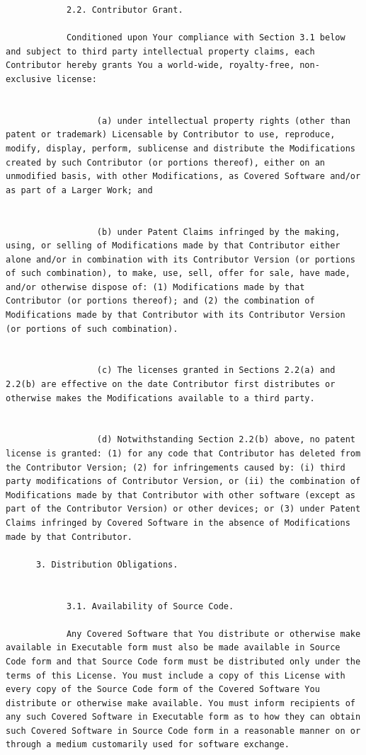 \documentclass[10pt, headsepline,DIV14,BCOR0.5cm]{scrreprt}
\begin{document}
\begin{lstlisting}
            2.2. Contributor Grant.

            Conditioned upon Your compliance with Section 3.1 below and subject to third party intellectual property claims, each Contributor hereby grants You a world-wide, royalty-free, non-exclusive license:
                  

                  (a) under intellectual property rights (other than patent or trademark) Licensable by Contributor to use, reproduce, modify, display, perform, sublicense and distribute the Modifications created by such Contributor (or portions thereof), either on an unmodified basis, with other Modifications, as Covered Software and/or as part of a Larger Work; and
                  

                  (b) under Patent Claims infringed by the making, using, or selling of Modifications made by that Contributor either alone and/or in combination with its Contributor Version (or portions of such combination), to make, use, sell, offer for sale, have made, and/or otherwise dispose of: (1) Modifications made by that Contributor (or portions thereof); and (2) the combination of Modifications made by that Contributor with its Contributor Version (or portions of such combination).
                  

                  (c) The licenses granted in Sections 2.2(a) and 2.2(b) are effective on the date Contributor first distributes or otherwise makes the Modifications available to a third party.
                  

                  (d) Notwithstanding Section 2.2(b) above, no patent license is granted: (1) for any code that Contributor has deleted from the Contributor Version; (2) for infringements caused by: (i) third party modifications of Contributor Version, or (ii) the combination of Modifications made by that Contributor with other software (except as part of the Contributor Version) or other devices; or (3) under Patent Claims infringed by Covered Software in the absence of Modifications made by that Contributor.

      3. Distribution Obligations.
            

            3.1. Availability of Source Code.

            Any Covered Software that You distribute or otherwise make available in Executable form must also be made available in Source Code form and that Source Code form must be distributed only under the terms of this License. You must include a copy of this License with every copy of the Source Code form of the Covered Software You distribute or otherwise make available. You must inform recipients of any such Covered Software in Executable form as to how they can obtain such Covered Software in Source Code form in a reasonable manner on or through a medium customarily used for software exchange.
            


\end{lstlisting}
\end{document}
